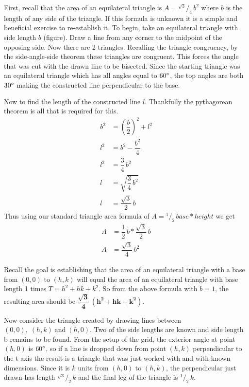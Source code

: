 \documentclass[12pt,letter]{article}
\newcommand*\rfrac[2]{{}^{#1}\!/_{#2}}
\begin{document}
First, recall that the area of an equilateral triangle is $A = \rfrac {\sqrt{3}} {4} \, b^2$ where $b$ is the length of any side of the triangle. If this formula is unknown it is a simple and beneficial exercise to re-establish it. To begin, take an equilateral triangle with side length $b$ (figure). Draw a line from any corner to the midpoint of the opposing side. Now there are 2 triangles. Recalling the triangle congruency, by the side-angle-side theorem these triangles are congruent. This forces the angle that was cut with the drawn line to be bisected. Since the starting triangle was an equilateral triangle which has all angles equal to $60\degree$, the top angles are both $30\degree$ making the constructed line perpendicular to the base.

Now to find the length of the constructed line $l$. Thankfully the pythagorean theorem is all that is required for this.
\begin{align*}
b^2 &= \left(\dfrac{b} {2}\right)^2 + l^2 \\
l^2 &= b^2 - \dfrac{b^2} {4} \\
l^2 &= \dfrac{3} {4} \, b^2 \\
l &= \sqrt{\dfrac{3} {4} \, b^2} \\
l &= \dfrac{\sqrt{3}} {2} \, b
\end{align*}
Thus using our standard triangle area formula of $A = \rfrac{1} {2} \, base * height$ we get
\begin{align*}
A &= \dfrac{1} {2} \, b * \dfrac{\sqrt{3}} {2} \, b \\
A &= \dfrac{\sqrt{3}} {4} \, b^2
\end{align*} 

Recall the goal is establishing that the area of an equilateral triangle with a base from $(0,0)$ to $(h,k)$ will equal the area of an equilateral triangle with base length 1 times $T = h^2 + hk + k^2$. So from the above formula with $b = 1$, the resulting area should be $\mathbf{ \dfrac{\sqrt{3}} {4} \, (h^2 + hk + k^2) }$. 

Now consider the triangle created by drawing lines between $(0,0), \; (h,k) \; \text{and} \; (h,0)$. Two of the side lengths are known and side length b remains to be found. From the setup of the grid, the exterior angle at point $(h,0)$ is $60\degree$, so if a line is dropped down from point $(h,k)$ perpendicular to the t-axis the result is a triangle that was just worked with and with known dimensions. Since it is $k$ units from $(h,0)$ to $(h,k)$, the perpendicular just drawn has length $\rfrac{\sqrt{3}} {2} \, k$ and the final leg of the triangle is $\rfrac 1 2 \, k$.
\end{document}
